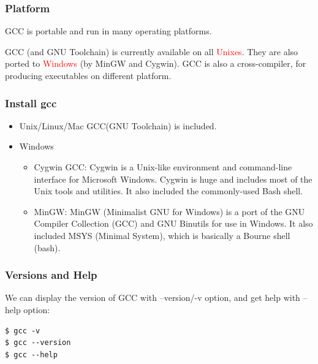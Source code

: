 \documentclass{beamer}
\begin{document}
\begin{frame}
\frametitle{Platform}
GCC is portable and run in many operating platforms.

 GCC (and GNU Toolchain) is currently available on all \textcolor{red}{Unixes}. They are also ported to \textcolor{red}{Windows} (by MinGW and Cygwin). GCC is also a cross-compiler, for producing executables on different platform.
\end{frame}
\begin{frame}
\frametitle{Install gcc}
\begin{itemize}
\item Unix/Linux/Mac GCC(GNU Toolchain) is included.
\item Windows
\begin{itemize}
\item Cygwin GCC: Cygwin is a Unix-like environment and command-line interface for Microsoft Windows. Cygwin is huge and includes most of the Unix tools and utilities. It also included the commonly-used Bash shell.
\item MinGW: MinGW (Minimalist GNU for Windows) is a port of the GNU Compiler Collection (GCC) and GNU Binutils for use in Windows. It also included MSYS (Minimal System), which is basically a Bourne shell (bash).
\end{itemize}
\end{itemize}
\end{frame}

\begin{frame}[fragile]
\frametitle{Versions and Help}
We can display the version of GCC with --version/-v option, and get help with --help option:
\begin{example}
\begin{verbatim}
$ gcc -v
$ gcc --version
$ gcc --help
\end{verbatim}
\end{example}
\end{frame}
\end{document}
